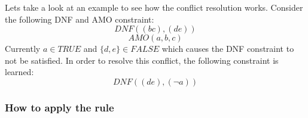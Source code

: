 Lets take a look at an example to see how the conflict resolution works. Consider the following DNF and AMO constraint:
\begin{displaymath}
DNF((bc),(de))
\end{displaymath}
\begin{displaymath}
AMO(a,b,c)
\end{displaymath}
Currently $a \in TRUE$ and $\{d,e\} \in FALSE$ which causes the DNF constraint to not be satisfied. In order to resolve this conflict, the following constraint is learned:
\begin{displaymath}
DNF((de),(\neg a))
\end{displaymath}

\subsubsection{How to apply the rule}

